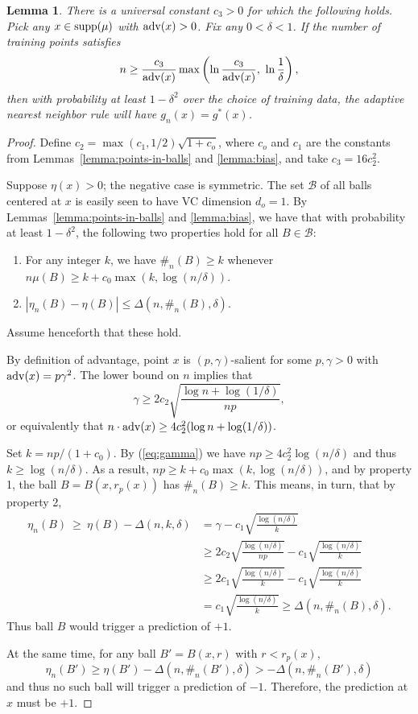 \documentclass{article}
\def\B{{\mathcal B}}
\def\supp{{\rm supp}}
\def\adv{{\rm adv}}
\newtheorem{lemma}[theorem]{Lemma}
\begin{document}
\begin{lemma}
There is a universal constant $c_3 > 0$ for which the following holds. Pick any $x \in \supp(\mu)$ with $\adv(x) > 0$. Fix any $0 < \delta < 1$. If the number of training points satisfies
$$ n \geq \frac{c_3}{\adv(x)} \max\left(\ln \frac{c_3}{\adv(x)}, \ \ln \frac{1}{\delta} \right), $$
then with probability at least $1-\delta^2$ over the choice of training data, the adaptive nearest neighbor rule will have $g_n(x) = g^*(x)$.
\label{lemma:pointwise}
\end{lemma}
\begin{proof}
Define $c_2 = \max(c_1, 1/2) \sqrt{1+c_o}$, where $c_o$ and $c_1$ are the constants from Lemmas~\ref{lemma:points-in-balls} and \ref{lemma:bias}, and take $c_3 = 16 c_2^2$.

Suppose $\eta(x) > 0$; the negative case is symmetric. The set $\B$ of all balls centered at $x$ is easily seen to have VC dimension $d_o = 1$. By Lemmas~\ref{lemma:points-in-balls} and \ref{lemma:bias}, we have that with probability at least $1-\delta^2$, the following two properties hold for all $B \in \B$:
\begin{enumerate}
\item For any integer $k$, we have $\#_n(B) \geq k$ whenever $n \mu(B) \geq k + c_0 \max(k, \log (n/\delta))$.
\item $|\eta_n(B) - \eta(B)| \leq \Delta(n, \#_n(B), \delta)$.
\end{enumerate}
Assume henceforth that these hold.

By definition of advantage, point $x$ is $(p,\gamma)$-salient for some $p,\gamma> 0$ with $\adv(x) = p\gamma^2$. The lower bound on $n$ implies that
\begin{equation}
\gamma \geq 2c_2 \sqrt{\frac{\log n + \log (1/\delta)}{np}} ,
\label{eq:gamma}
\end{equation}
or equivalently that $n \cdot \adv(x) \geq 4c_2^2 (\log n + \log (1/\delta))$.

Set $k = np/(1 + c_0)$. By (\ref{eq:gamma}) we have $np \geq 4 c_2^2 \log (n/\delta)$ and thus $k \geq \log (n/\delta)$. As a result, $np \geq k + c_0 \max(k, \log (n/\delta))$, and by property 1, the ball $B = B(x, r_p(x))$ has $\#_n(B) \geq k$. This means, in turn, that by property 2,
\begin{align*}
\eta_n(B) \ \geq \ \eta(B) - \Delta(n, k, \delta)
&= \gamma - c_1 \sqrt{\frac{\log (n/\delta)}{k}} \\
&\geq 2c_2 \sqrt{\frac{\log (n/\delta)}{np}} - c_1 \sqrt{\frac{\log (n/\delta)}{k}}\\
&\geq 2c_1 \sqrt{\frac{\log (n/\delta)}{k}} - c_1 \sqrt{\frac{\log (n/\delta)}{k}} \\
&= c_1 \sqrt{\frac{\log (n/\delta)}{k}} \geq \Delta(n, \#_n(B), \delta) .
\end{align*}
Thus ball $B$ would trigger a prediction of $+1$.

At the same time, for any ball $B' = B(x, r)$ with $r < r_p(x)$,
$$ \eta_n(B') \geq \eta(B') - \Delta(n, \#_n(B'), \delta) > -\Delta(n, \#_n(B'), \delta) $$
and thus no such ball will trigger a prediction of $-1$. Therefore, the prediction at $x$ must be $+1$.
\end{proof}
\end{document}
